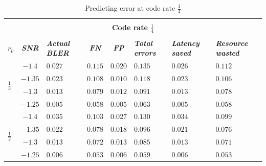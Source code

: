\documentclass[conference]{IEEEtran}
\begin{document}
\begin{table}[htbp]
\caption{Predicting error at code rate $\frac{1}{4}$}
\begin{center}
\begin{tabular}{ |p{0.5em}|c|p{2em}|c|c|p{2.5em}|p{2.5em}|p{3em}|}
 \hline
 \multicolumn{8}{|c|}{} \\[-1em]
 \multicolumn{8}{|c|}{\textbf{Code rate $\frac{1}{4}$}} \\
 \multicolumn{8}{|c|}{} \\[-1em]
 \hline
\textbf{\textit{$r_{p}$}} & \textbf{\textit{SNR}} &\textbf{\textit{Actual BLER}} &\textbf{\textit{FN}} &\textbf{\textit{FP}} &\textbf{\textit{Total errors}}&\textbf{\textit{Latency saved}}&\textbf{\textit{Resource wasted}} \\
 \hline
 \multirow{4}{1em}{\centering $\frac{1}{3}$} & $-1.4$ &$0.027$ &$0.115$ &$0.020$ &$0.135$&$0.026$&$0.112$  \\\cline{2-8}
 & $-1.35$ &$0.023$ &$0.108$ &$0.010$ &$0.118$&$0.023$&$0.106$  \\\cline{2-8}
& $-1.3$ &$0.013$ &$0.079$ &$0.012$ &$0.091$&$0.013$&$0.078$  \\\cline{2-8}
& $-1.25$ &$0.005$ &$0.058$ &$0.005$ &$0.063$&$0.005$&$0.058$  \\\cline{2-8}
 \hline
 \multirow{4}{1em}{\centering $\frac{1}{2}$} & $-1.4$ &$0.035$ &$0.103$ &$0.027$ &$0.130$&$0.034$&$0.099$ \\\cline{2-8}
& $-1.35$ &$0.022$ &$0.078$ &$0.018$ &$0.096$&$0.021$&$0.076$ \\\cline{2-8}
& $-1.3$ &$0.013$ &$0.072$ &$0.013$ &$0.085$&$0.013$&$0.071$ \\\cline{2-8}
& $-1.25$ &$0.006$ &$0.053$ &$0.006$ &$0.059$&$0.006$&$0.053$ \\\cline{2-8}
 \hline
\end{tabular}
\label{tab1}
\end{center}
\end{table}

\end{document}
